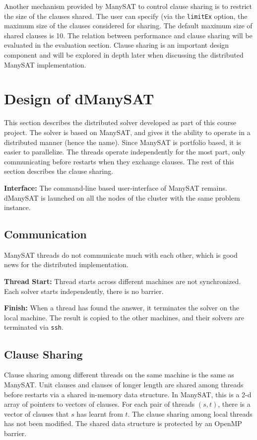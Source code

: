 \documentclass{article}
\begin{document}
Another mechanism provided by ManySAT to control clause sharing is to
restrict the size of the clauses shared. The user can specify (via the
\texttt{limitEx} option, the maximum size of the clauses considered
for sharing. The default maximum size of shared clauses is 10. The
relation between performance and clause sharing will be evaluated in
the evaluation section. Clause sharing is an important design
component and will be explored in depth later when discussing the
distributed ManySAT implementation.


\section{Design of dManySAT}

This section describes the distributed solver developed as part of
this course project. The solver is based on ManySAT, and gives it the
ability to operate in a distributed manner (hence the name). Since
ManySAT is portfolio based, it is easier to parallelize. The threads
operate independently for the most part, only communicating before
restarts when they exchange clauses. The rest of this section
describes the clause sharing.


\textbf{Interface: } The command-line based user-interface of ManySAT
remains. dManySAT is launched on all the nodes of the cluster with the
same problem instance. 

\subsection{Communication}

ManySAT threads do not communicate much with each other, which is good
news for the distributed implementation.

\textbf{Thread Start:} Thread starts across different machines are not
synchronized. Each solver starts independently, there is no barrier. 


\textbf{Finish: } When a thread has found the answer, it terminates
the solver on the local machine. The result is copied to the other
machines, and their solvers are terminated via \texttt{ssh}.

\subsection{Clause Sharing}

Clause sharing among different threads on the same machine is the same
as ManySAT. Unit clauses and clauses of longer length are shared among
threads before restarts via a shared in-memory data structure. In
ManySAT, this is a 2-d array  of pointers to vectors of clauses. For each
pair of threads $(s,t)$, there is a vector of clauses that $s$ has
learnt from $t$. The clause sharing among local threads has not been
modified. The shared data structure is protected by an OpenMP barrier. 
\end{document}
